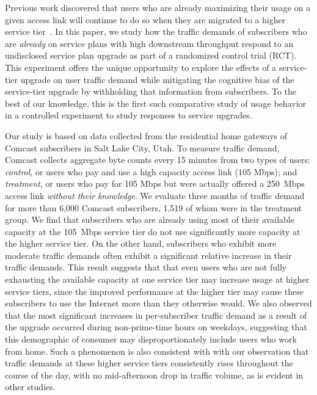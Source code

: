 
Previous work discovered that users who are already maximizing their
usage on a given access link will continue to do so when they are
migrated to a higher service tier~\cite{dasu-imc2014}. In this paper, we
study how the traffic demands of subscribers who are {\em already} on service
plans with high downstream throughput respond to an undisclosed service
plan upgrade as part of a randomized control trial (RCT). This
experiment offers the unique opportunity to explore the effects of a
service-tier upgrade on user traffic demand while mitigating the
cognitive bias of the service-tier upgrade by withholding that
information from subscribers. To the best of our knowledge, this is the
first such comparative study of usage behavior in a controlled
experiment to study responses to service upgrades.

Our study is based on data collected from the residential home gateways
of Comcast subscribers in Salt Lake City, Utah. To measure traffic
demand, Comcast collects aggregate byte counts every 15 minutes from two
types of users: {\em control}, or users who pay and use a high capacity
access link (105 Mbps); and {\em treatment}, or users who pay for 105
Mbps but were actually offered a 250~Mbps access link {\em without their
  knowledge}.  We evaluate three months of traffic demand for more than
6,000 Comcast subscribers, 1,519 of whom were in the treatment group.
We find that subscribers who are already using most of their available
capacity at the 105~Mbps service tier do not use significantly more
capacity at the higher service tier.  On the other hand, subscribers who
exhibit more moderate traffic demands often exhibit a significant
relative increase in their traffic demands.  This result suggests that
that even users who are not fully exhausting the available capacity at
one service tier may increase usage at higher service tiers, since the
improved performance at the higher tier may cause these subscribers to
use the Internet more than they otherwise would. We also observed that
the most significant increases in per-subscriber traffic demand as a
result of the upgrade occurred during non-prime-time hours on weekdays,
suggesting that this demographic of consumer may disproportionately
include users who work from home.  Such a phenomenon is also consistent
with with our observation that traffic demands at these higher service
tiers consistently rises throughout the course of the day, with no
mid-afternoon drop in traffic volume, as is evident in other studies.

